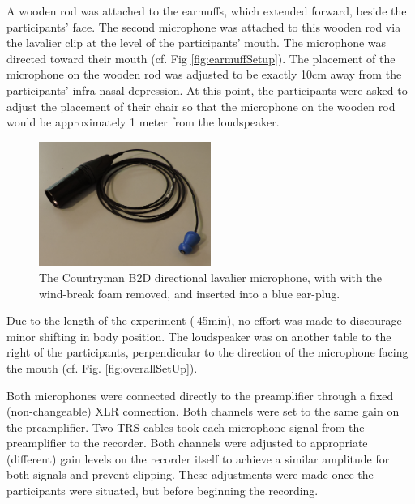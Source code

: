 A wooden rod was attached to the earmuffs, which extended forward, beside the participants' face.  
The second microphone was attached to this wooden rod via the lavalier clip at the level of the participants' mouth.  The microphone was directed toward their mouth (cf. Fig \ref{fig:earmuffSetup}).  
The placement of the microphone on the wooden rod was adjusted to be exactly 10cm away from the participants' infra-nasal depression.  At this point, the participants were asked to adjust the placement of their chair so that the microphone on the wooden rod would be approximately 1 meter from the loudspeaker. 
%
\begin{figure}
\includegraphics[width=0.5\textwidth]{figure/micInsertPlug.JPG}
\caption{The Countryman B2D directional lavalier microphone, with with the wind-break foam removed, and inserted into a blue ear-plug.}
\label{fig:micInsertPlug}
\end{figure}
%
Due to the length of the experiment ($~$45min), no effort was made to discourage minor shifting in body position.  The loudspeaker was on another table to the right of the participants, perpendicular to the direction of the microphone facing the mouth (cf. Fig. \ref{fig:overallSetUp}).

Both microphones were connected directly to the preamplifier through a fixed (non-changeable) XLR connection.  Both channels were set to the same gain on the preamplifier.  Two TRS cables took each microphone signal from the preamplifier to the recorder.  Both channels were adjusted to appropriate (different) gain levels on the recorder itself to achieve a similar amplitude for both signals and prevent clipping.  These adjustments were made once the participants were situated, but before beginning the recording.

